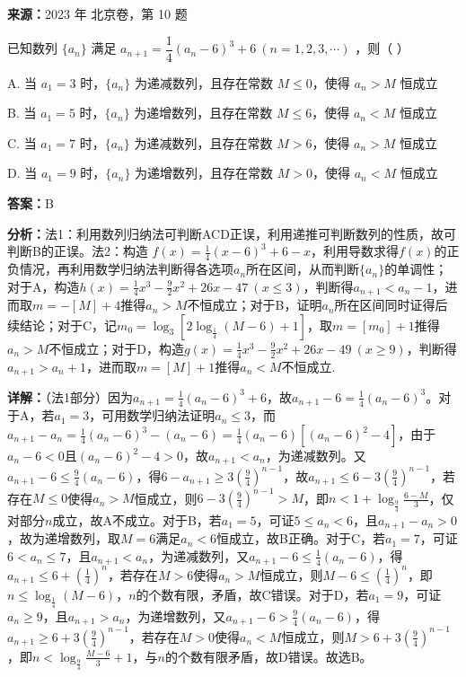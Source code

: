 \begin{question}[points=4]
\textbf{来源：}2023 年 北京卷，第 10 题\par
已知数列 $\{a_n\}$ 满足 $a_{n+1} = \dfrac{1}{4}(a_n - 6)^3 + 6\ (n = 1,2,3,\cdots)$ ，则（ ）
\begin{choices}
  \item A. 当 $a_1 = 3$ 时，$\{a_n\}$ 为递减数列，且存在常数 $M \le 0$，使得 $a_n > M$ 恒成立
  \item B. 当 $a_1 = 5$ 时，$\{a_n\}$ 为递增数列，且存在常数 $M \le 6$，使得 $a_n < M$ 恒成立
  \item C. 当 $a_1 = 7$ 时，$\{a_n\}$ 为递减数列，且存在常数 $M > 6$，使得 $a_n > M$ 恒成立
  \item D. 当 $a_1 = 9$ 时，$\{a_n\}$ 为递增数列，且存在常数 $M > 0$，使得 $a_n < M$ 恒成立
\end{choices}
\begin{solution}
\textbf{答案：}B

\textbf{分析：}法1：利用数列归纳法可判断ACD正误，利用递推可判断数列的性质，故可判断B的正误。法2：构造 $f(x)=\frac{1}{4}(x-6)^3+6-x$，利用导数求得$f(x)$的正负情况，再利用数学归纳法判断得各选项$a_n$所在区间，从而判断$\{a_n\}$的单调性；对于A，构造$h(x)=\frac{1}{4}x^3-\frac{9}{2}x^2+26x-47\ (x\le 3)$，判断得$a_{n+1}<a_n-1$，进而取$m=-[M]+4$推得$a_n>M$不恒成立；对于B，证明$a_n$所在区间同时证得后续结论；对于C，记$m_0=\log_3[2\log_{\frac{1}{4}}(M-6)+1]$，取$m=[m_0]+1$推得$a_n>M$不恒成立；对于D，构造$g(x)=\frac{1}{4}x^3-\frac{9}{2}x^2+26x-49\ (x\ge 9)$，判断得$a_{n+1}>a_n+1$，进而取$m=[M]+1$推得$a_n<M$不恒成立.

\textbf{详解：}（法1部分）因为$a_{n+1}=\frac{1}{4}(a_n-6)^3+6$，故$a_{n+1}-6=\frac{1}{4}(a_n-6)^3$。对于A，若$a_1=3$，可用数学归纳法证明$a_n\le 3$，而$a_{n+1}-a_n=\frac{1}{4}(a_n-6)^3-(a_n-6)=\frac{1}{4}(a_n-6)[(a_n-6)^2-4]$，由于$a_n-6<0$且$(a_n-6)^2-4>0$，故$a_{n+1}<a_n$，为递减数列。又$a_{n+1}-6\le \frac{9}{4}(a_n-6)$，得$6-a_{n+1}\ge 3(\frac{9}{4})^{n-1}$，故$a_{n+1}\le 6-3(\frac{9}{4})^{n-1}$，若存在$M\le 0$使得$a_n>M$恒成立，则$6-3(\frac{9}{4})^{n-1}>M$，即$n<1+\log_{\frac{9}{4}}\frac{6-M}{3}$，仅对部分$n$成立，故A不成立。对于B，若$a_1=5$，可证$5\le a_n<6$，且$a_{n+1}-a_n>0$，故为递增数列，取$M=6$满足$a_n<6$恒成立，故B正确。对于C，若$a_1=7$，可证$6<a_n\le 7$，且$a_{n+1}<a_n$，为递减数列，又$a_{n+1}-6\le \frac{1}{4}(a_n-6)$，得$a_{n+1}\le 6+(\frac{1}{4})^n$，若存在$M>6$使得$a_n>M$恒成立，则$M-6\le (\frac{1}{4})^n$，即$n\le \log_{\frac{1}{4}}(M-6)$，$n$的个数有限，矛盾，故C错误。对于D，若$a_1=9$，可证$a_n\ge 9$，且$a_{n+1}>a_n$，为递增数列，又$a_{n+1}-6>\frac{9}{4}(a_n-6)$，得$a_{n+1}\ge 6+3(\frac{9}{4})^{n-1}$，若存在$M>0$使得$a_n<M$恒成立，则$M>6+3(\frac{9}{4})^{n-1}$，即$n<\log_{\frac{9}{4}}\frac{M-6}{3}+1$，与$n$的个数有限矛盾，故D错误。故选B。
\end{solution}
\end{question}


